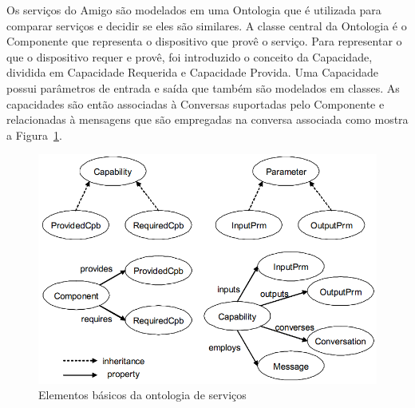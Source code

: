 Os serviços do Amigo são modelados em uma Ontologia que é utilizada para comparar serviços e decidir se eles são similares. A classe central da Ontologia é o Componente que representa o dispositivo que provê o serviço. Para representar o que o dispositivo requer e provê, foi introduzido o conceito da Capacidade, dividida em Capacidade Requerida e Capacidade Provida. Uma Capacidade possui parâmetros de entrada e saída que também são modelados em classes. As capacidades são então associadas à Conversas suportadas pelo Componente e relacionadas à mensagens que são empregadas na conversa associada como mostra a Figura~\ref{fig:amigoServiceOntology}.

\begin{figure}[ht]
\center
\includegraphics[scale=0.5]{imagens/amigo-ontology}
\caption{Elementos básicos da ontologia de serviços}
\label{fig:amigoServiceOntology}
\end{figure}

